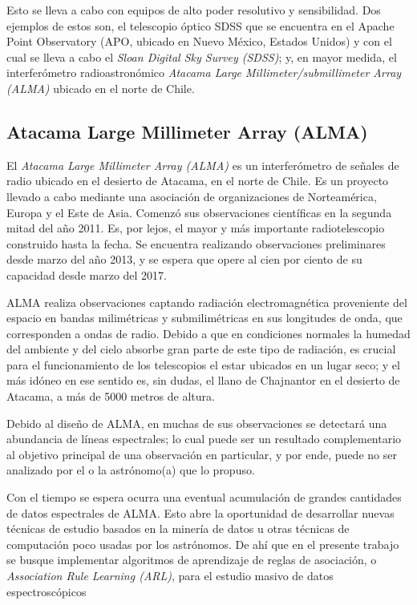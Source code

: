 Esto se lleva a cabo con equipos de alto poder resolutivo y sensibilidad. Dos ejemplos de estos son, el telescopio óptico SDSS que se encuentra en el Apache Point Observatory (APO, ubicado en Nuevo México, Estados Unidos) y con el cual se lleva a cabo el \textit{Sloan Digital Sky Survey (SDSS)}; y, en mayor medida, el interferómetro radioastronómico \textit{Atacama Large Millimeter/submillimeter Array (ALMA)} ubicado en el norte de Chile.

\subsection{Atacama Large Millimeter Array (ALMA)}

El \textit{Atacama Large Millimeter Array (ALMA)} \cite{almaobservatory.org} \cite{wootten2009atacama} es un interferómetro de señales de radio ubicado en el desierto de Atacama, en el norte de Chile. Es un proyecto llevado a cabo mediante una asociación de organizaciones de Norteamérica, Europa y el Este de Asia. Comenzó sus observaciones científicas en la segunda mitad del año 2011. Es, por lejos, el mayor y más importante radiotelescopio construido hasta la fecha. Se encuentra realizando observaciones preliminares desde marzo del año 2013, y se espera que opere al cien por ciento de su capacidad desde marzo del 2017.

ALMA realiza observaciones captando radiación electromagnética proveniente del espacio en bandas milimétricas y submilimétricas en sus longitudes de onda, que corresponden a ondas de radio. Debido a que en condiciones normales la humedad del ambiente y del cielo absorbe gran parte de este tipo de radiación, es crucial para el funcionamiento de los telescopios el estar ubicados en un lugar seco; y el más idóneo en ese sentido es, sin dudas, el llano de Chajnantor en el desierto de Atacama, a más de 5000 metros de altura.

Debido al diseño de ALMA, en muchas de sus observaciones se detectará una abundancia de líneas espectrales; lo cual puede ser un resultado complementario al objetivo principal de una observación en particular, y por ende, puede no ser analizado por el o la astrónomo(a) que lo propuso.

Con el tiempo se espera ocurra una eventual acumulación de grandes cantidades de datos espectrales de ALMA. Esto abre la oportunidad de desarrollar nuevas técnicas de estudio basados en la minería de datos u otras técnicas de computación poco usadas por los astrónomos. De ahí que en el presente trabajo se busque implementar algoritmos de aprendizaje de reglas de asociación, o \textit{Association Rule Learning (ARL)}, para el estudio masivo de datos espectroscópicos

